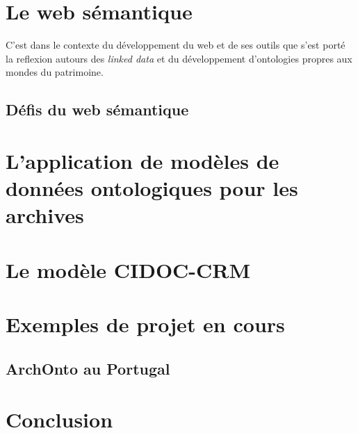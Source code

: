 \documentclass[12pt]{report}
\begin{document}
\section{Le web sémantique}
C'est dans le contexte du développement du web et de ses outils que s'est porté la reflexion autours des \textit{linked data} et du développement d'ontologies propres aux mondes du patrimoine.
\subsection{Défis du web sémantique}
\section{L'application de modèles de données ontologiques pour les archives}
\section{Le modèle CIDOC-CRM}
\section{Exemples de projet en cours}
\subsection{ArchOnto au Portugal}
\section{Conclusion}
\end{document}
